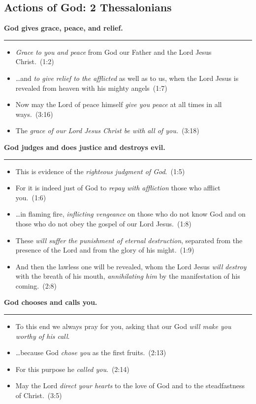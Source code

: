 \documentclass{article}
\newcommand{\godcategory}[1]{\bigskip\noindent \textbf{#1}\smallskip\hrule\nopagebreak}
\begin{document}
\begin{landscape}
\begin{multicols}{3}
\section{Actions of God: 2 Thessalonians}
\godcategory{God gives grace, peace, and relief.}
\begin{itemize}
  \item \emph{Grace to you and peace} from God our Father and the Lord Jesus Christ.~(1:2)
  \item \ldots and \emph{to give relief to the afflicted} as well as to us, when the Lord Jesus is revealed from heaven with his mighty angels~(1:7)
  \item Now may the Lord of peace himself \emph{give you peace} at all times in all ways.~(3:16)
  \item The \emph{grace of our Lord Jesus Christ be with all of you.}~(3:18)
\end{itemize}

\godcategory{God judges and does justice and destroys evil.}
\begin{itemize}
  \item This is evidence of the \emph{righteous judgment of God}.~(1:5)
  \item For it is indeed just of God to \emph{repay with affliction} those who afflict you.~(1:6)
  \item \ldots in flaming fire, \emph{inflicting vengeance} on those who do not know God and on those who do not obey the gospel of our Lord Jesus.~(1:8)
  \item These \emph{will suffer the punishment of eternal destruction}, separated from the presence of the Lord and from the glory of his might.~(1:9)
  \item And then the lawless one will be revealed, whom the Lord Jesus \emph{will destroy} with the breath of his mouth, \emph{annihilating him} by the manifestation of his coming.~(2:8)
\end{itemize}

\godcategory{God chooses and calls you.}
\begin{itemize}
  \item To this end we always pray for you, asking that our God \emph{will make you worthy of his call}.
  \item \ldots because God \emph{chose you} as the first fruits.~(2:13)
  \item For this purpose he \emph{called you}.~(2:14)
  \item May the Lord \emph{direct your hearts} to the love of God and to the steadfastness of Christ.~(3:5)
\end{itemize}


\end{multicols}
\end{landscape}
\end{document}
